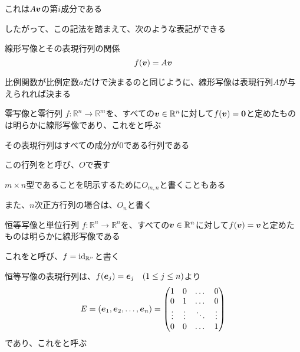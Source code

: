 \documentclass[../../../topic_linear-map]{subfiles}
\begin{document}
これは$A\vb*{v}$の第$i$成分である

\br

したがって、この記法を踏まえて、次のような表記ができる

\begin{theorem}{線形写像とその表現行列の関係}
  \begin{equation*}
    f(\vb*{v}) = A\vb*{v}
  \end{equation*}
\end{theorem}

比例関数が比例定数$a$だけで決まるのと同じように、線形写像は表現行列$A$が与えられれば決まる

\sectionline

\begin{definition}{零写像と零行列}
  $f\colon \mathbb{R}^n \to \mathbb{R}^m$を、すべての$\vb*{v} \in \mathbb{R}^n$に対して$f(\vb*{v}) = \vb*{0}$と定めたものは明らかに線形写像であり、これをと呼ぶ

  その表現行列はすべての成分が0である行列である

  この行列をと呼び、$O$で表す
\end{definition}

$m \times n$型であることを明示するために$O_{m,n}$と書くこともある

また、$n$次正方行列の場合は、$O_n$と書く

\sectionline

\begin{definition}{恒等写像と単位行列}
  $f\colon \mathbb{R}^n \to \mathbb{R}^n$を、すべての$\vb*{v} \in \mathbb{R}^n$に対して$f(\vb*{v}) = \vb*{v}$と定めたものは明らかに線形写像である

  これをと呼び、$f = \operatorname{id}_{\mathbb{R}^n}$と書く

  恒等写像の表現行列は、$f(\vb*{e}_j) = \vb*{e}_j \quad (1 \leq j \leq n)$より
  \begin{equation*}
    E = (\vb*{e}_1, \vb*{e}_2, \dots, \vb*{e}_n) = \begin{pmatrix}
      1      & 0      & \dots  & 0      \\
      0      & 1      & \dots  & 0      \\
      \vdots & \vdots & \ddots & \vdots \\
      0      & 0      & \dots  & 1
    \end{pmatrix}
  \end{equation*}
  であり、これをと呼ぶ
\end{definition}
\end{document}
